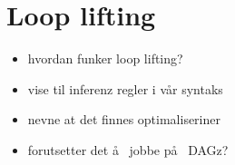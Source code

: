 \section{Loop lifting}
\label{sect:method:loop_lifting}

\begin{itemize}
  \item hvordan funker loop lifting?
  \item vise til inferenz regler i v\aa r syntaks
  \item nevne at det finnes optimaliseriner
  \item forutsetter det \aa~ jobbe p\aa~ DAGz?
\end{itemize}
